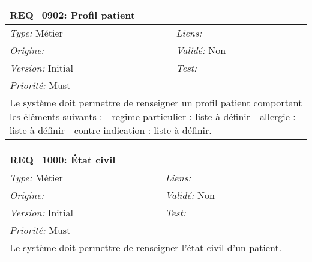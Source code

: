 \begin{table}[!h]

\begin{tabular}{|p{60mm}p{100mm}|}

\hline

\multicolumn{2}{|l|}{\textbf{REQ\_0902:} Profil patient} \\ \hline

\emph{Type:} Métier & \emph{Liens:}  \\

\emph{Origine:}  & \emph{Validé:} Non \\

\emph{Version:} Initial & \emph{Test:}  \\

\emph{Priorité:} Must & \\ \hline

\multicolumn{2}{|p{16cm}|}{Le système doit permettre de renseigner un profil patient comportant les éléments suivants :  
- regime particulier : liste à définir  
- allergie : liste à définir  
- contre-indication : liste à définir.} \\ \hline

\end{tabular}

\end{table}



\begin{table}[!h]

\begin{tabular}{|p{60mm}p{100mm}|}

\hline

\multicolumn{2}{|l|}{\textbf{REQ\_1000:} État civil} \\ \hline

\emph{Type:} Métier & \emph{Liens:}  \\

\emph{Origine:}  & \emph{Validé:} Non \\

\emph{Version:} Initial & \emph{Test:}  \\

\emph{Priorité:} Must & \\ \hline

\multicolumn{2}{|p{16cm}|}{Le système doit permettre de renseigner l'état civil d'un patient.} \\ \hline

\end{tabular}

\end{table}



